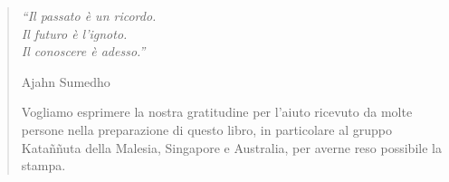 \cleartorecto
\thispagestyle{empty}

\mbox{}\vfill

\begin{verse}


{\itshape
``Il passato è un ricordo.\\
Il futuro è l'ignoto.\\
Il conoscere è adesso.''

Ajahn Sumedho}


Vogliamo esprimere la nostra gratitudine per l'aiuto ricevuto da molte
persone nella preparazione di questo libro, in particolare al gruppo
Kataññuta della Malesia, Singapore e Australia, per averne reso
possibile la stampa.

\end{verse}

\vfill\mbox{}

